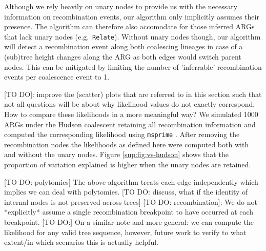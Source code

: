 \documentclass{article}
\newcommand{\relate}[0]{\texttt{Relate}}
\begin{document}
Although we rely heavily on unary nodes to provide us with the necessary 
information on recombination events, our algorithm only implicitly assumes their presence.
The algorithm can therefore also accomodate for 
those inferred ARGs that lack unary nodes (e.g.\ \relate). 
Without unary nodes though, our algorithm will detect a recombination event along 
both coalescing lineages in case of a (sub)tree height changes along the ARG as both 
edges would switch parent nodes. This can be mitigated by limiting the number of 
'inferrable' recombination events per coalescence event to 1.

[TO DO]: improve the (scatter) plots that are referred to in this section such that not 
all questions will be about why likelihood values do not exactly correspond. How to 
compare these likelihoods in a more meaningful way?
We simulated 1000 ARGs under the Hudson coalescent retaining all recombination information 
and computed the corresponding likelihood using \texttt{msprime} \citep{baumdicker_efficient_2021}. 
After removing the recombination nodes the likelihoods as defined here were computed both with and 
without the unary nodes. Figure \ref{sup:fig:vs-hudson} shows that the proportion of variation 
explained is higher when the unary nodes are retained.

[TO DO: polytomies] The above algorithm treats each edge independently which implies 
we can deal with polytomies.
[TO DO: discuss, what if the identity of internal nodes is not preserved across trees]
[TO DO: recombination]: We do not *explicitly* assume a single recombination breakpoint to have 
occurred at each breakpoint.
[TO DO:] On a similar note and more general: we can compute the likelihood for any 
valid tree sequence, however, future work to verify to what extent/in which scenarios 
this is actually helpful.
\end{document}
